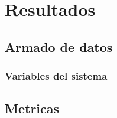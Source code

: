 \section{Resultados}


\subsection{Armado de datos}

\subsubsection{Variables del sistema}

\subsection{Metricas}

